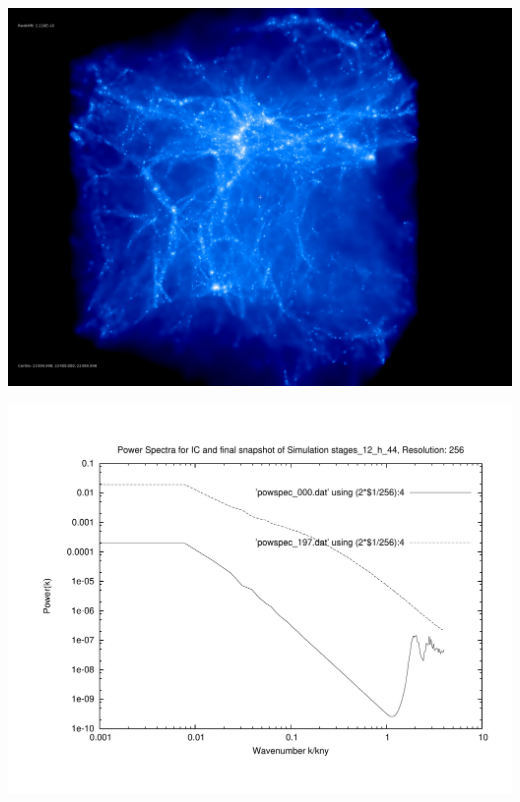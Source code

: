 \includegraphics[scale=0.15]{r256/h70/stages_12_h_44/rotate_00131.jpg} 

\includegraphics[scale=0.5]{r256/h70/stages_12_h_44/plot_powspec_stages_12_h_44.pdf}


